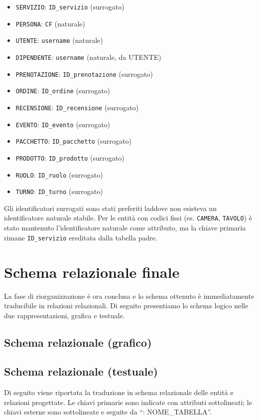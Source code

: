 \documentclass[a4paper,12pt]{report}
\begin{document}
\begin{itemize}
	\item \texttt{SERVIZIO}: \texttt{ID\_servizio} (surrogato)
	\item \texttt{PERSONA}: \texttt{CF} (naturale)
	\item \texttt{UTENTE}: \texttt{username} (naturale)
	\item \texttt{DIPENDENTE}: \texttt{username} (naturale, da UTENTE)
	\item \texttt{PRENOTAZIONE}: \texttt{ID\_prenotazione} (surrogato)
	\item \texttt{ORDINE}: \texttt{ID\_ordine} (surrogato)
	\item \texttt{RECENSIONE}: \texttt{ID\_recensione} (surrogato)
	\item \texttt{EVENTO}: \texttt{ID\_evento} (surrogato)
	\item \texttt{PACCHETTO}: \texttt{ID\_pacchetto} (surrogato)
	\item \texttt{PRODOTTO}: \texttt{ID\_prodotto} (surrogato)
	\item \texttt{RUOLO}: \texttt{ID\_ruolo} (surrogato)
	\item \texttt{TURNO}: \texttt{ID\_turno} (surrogato)
\end{itemize}

Gli identificatori surrogati sono stati preferiti laddove non esisteva un identificatore naturale stabile. Per le entità con codici fissi (es. \texttt{CAMERA}, \texttt{TAVOLO}) è stato mantenuto l'identificatore naturale come attributo, ma la chiave primaria rimane \texttt{ID\_servizio} ereditata dalla tabella padre.

\section{Schema relazionale finale}
La fase di riorganizzazione è ora conclusa e lo schema ottenuto è immediatamente traducibile
in relazioni relazionali. Di seguito presentiamo lo schema logico nelle due rappresentazioni, grafica e testuale.

\subsection{Schema relazionale (grafico)}

\subsection{Schema relazionale (testuale)}
Di seguito viene riportata la traduzione in schema relazionale delle entità e relazioni progettate.
Le chiavi primarie sono indicate con attributi sottolineati; le chiavi esterne sono sottolineate e seguite da ``: NOME\_TABELLA''.
\end{document}
